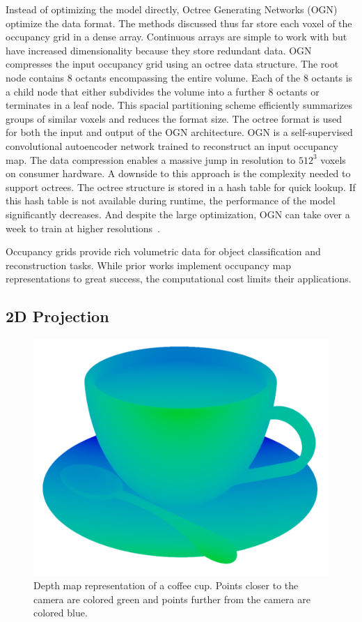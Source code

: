 Instead of optimizing the model directly, Octree Generating Networks (OGN)~\cite{Tatarchenko2017} optimize the data format. The methods discussed thus far store each voxel of the occupancy grid in a dense array. Continuous arrays are simple to work with but have increased dimensionality because they store redundant data. OGN compresses the input occupancy grid using an octree data structure. The root node contains 8 octants encompassing the entire volume. Each of the 8 octants is a child node that either subdivides the volume into a further 8 octants or terminates in a leaf node. This spacial partitioning scheme efficiently summarizes groups of similar voxels and reduces the format size. The octree format is used for both the input and output of the OGN architecture. OGN is a self-supervised convolutional autoencoder network trained to reconstruct an input occupancy map. The data compression enables a massive jump in resolution to $512^3$ voxels on consumer hardware. A downside to this approach is the complexity needed to support octrees. The octree structure is stored in a hash table for quick lookup. If this hash table is not available during runtime, the performance of the model significantly decreases. And despite the large optimization, OGN can take over a week to train at higher resolutions~\cite{Tatarchenko2017}.

Occupancy grids provide rich volumetric data for object classification and reconstruction tasks. While prior works implement occupancy map representations to great success, the computational cost limits their applications.

\newpage


\subsection{2D Projection}

\begin{figure}[ht]
	\centering
	\includegraphics[scale=0.2]{Images/Depth Map Cup}
	\caption{Depth map representation of a coffee cup. Points closer to the camera are colored green and points further from the camera are colored blue.}
	\label{fig:depth_map_cup}
\end{figure}

